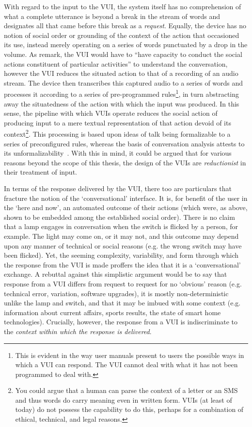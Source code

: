\begin{corrections}
With regard to the input to the \ac{VUI}, the system itself has no comprehension of what a complete utterance is beyond a  break in the stream of words and designates all that came before this break as a \textit{request}.
Equally, the device has no notion of social order or grounding of the context of the action that occasioned its use, instead merely operating on a series of words punctuated by a drop in the volume.
As \citet{Button1995} remark, the \ac{VUI} would have to ``have capacity to conduct the social actions constituent of particular activities'' to understand the conversation, however the \ac{VUI} reduces the situated action to that of a recording of an audio stream.
The device then transcribes this captured audio to a series of words and processes it according to a series of pre-programmed rules\footnote{This is evident in the way user manuals present to users the possible ways in which a \ac{VUI} can respond. The \ac{VUI} cannot deal with what it has not been programmed to deal with.}, in turn abstracting away the situatedness of the action with which the input was produced.
In this sense, the pipeline with which \acp{VUI} operate reduces the social action of producing input to a mere textual representation of that action devoid of its context\footnote{You could argue that a human can parse the context of a letter or an SMS and thus words do carry meaning even in written form. \acp{VUI} (at least of today) do not possess the capability to do this, perhaps for a combination of ethical, technical, and legal reasons.}.
This processing is based upon ideas of talk being formalizable to a series of preconfigured rules, whereas the basis of conversation analysis attests to its unformalizability~\citep{Sacks1974}.
With this in mind, it could be argued that for various reasons beyond the scope of this thesis, the design of the \acp{VUI} are \textit{reductionist} in their treatment of input.

In terms of the response delivered by the \ac{VUI}, there too are particulars that fracture the notion of the `conversational' interface.
It is, for benefit of the user in the `here and now', an automated outcome of their actions (which were, as above, shown to be embedded among the established social order).
There is no claim that a lamp engages in conversation when the switch is flicked by a person, for example.
The light may come on, or it may not, and this outcome may depend upon any manner of technical or social reasons (e.g. the wrong switch may have been flicked).
Yet, the seeming complexity, variability, and form through which the response from the \ac{VUI} is made proffers the idea that it is a `conversational' exchange.
A rebuttal against this simplistic argument would be to say that response from a \ac{VUI} differs from request to request for no `obvious' reason (e.g. technical error, variation, software upgrades), it is mostly non-deterministic unlike the lamp and switch, and that it may be imbued with some context (e.g. information about current affairs, sports results, the state of smart home technologies).
Crucially, however, the response from a \ac{VUI} is indiscriminate to the \textit{context within which the response is delivered}.


\end{corrections}
